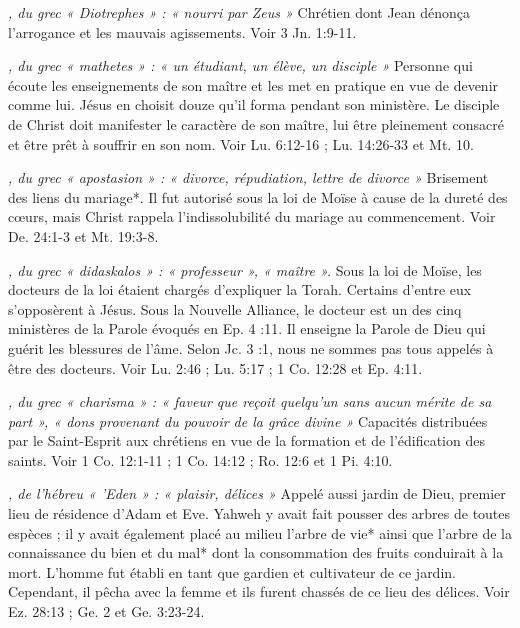 \begin{multicols}{2}
{\textit{, du grec « Diotrephes » : « nourri par Zeus »}\newline
Chrétien dont Jean dénonça l'arrogance et les mauvais agissements. Voir 3 Jn. 1:9-11.

\textit{, du grec « mathetes » : « un étudiant, un élève, un disciple »}\newline
Personne qui écoute les enseignements de son maître et les met en pratique en vue de devenir comme lui. Jésus en choisit douze qu'il forma pendant son ministère. Le disciple de Christ doit manifester le caractère de son maître, lui être pleinement consacré et être prêt à souffrir en son nom. Voir Lu. 6:12-16 ; Lu. 14:26-33 et Mt. 10.

\textit{, du grec « apostasion » : « divorce, répudiation, lettre de divorce »}\newline
Brisement des liens du mariage*. Il fut autorisé sous la loi de Moïse à cause de la dureté des cœurs, mais Christ rappela l'indissolubilité du mariage au commencement. Voir De. 24:1-3 et Mt. 19:3-8.

\textit{, du grec « didaskalos » : « professeur », « maître ».}\newline
Sous la loi de Moïse, les docteurs de la loi étaient chargés d'expliquer la Torah. Certains d'entre eux s'opposèrent à Jésus. Sous la Nouvelle Alliance, le docteur est un des cinq ministères de la Parole évoqués en Ep. 4 :11. Il enseigne la Parole de Dieu qui guérit les blessures de l'âme. Selon Jc. 3 :1, nous ne sommes pas tous appelés à être des docteurs. Voir Lu. 2:46 ; Lu. 5:17 ; 1 Co. 12:28 et Ep. 4:11.

\textit{, du grec « charisma » : « faveur que reçoit quelqu'un sans aucun mérite de sa part », « dons provenant du pouvoir de la grâce divine »}\newline
Capacités distribuées par le Saint-Esprit aux chrétiens en vue de la formation et de l'édification des saints. Voir 1 Co. 12:1-11 ; 1 Co. 14:12 ; Ro. 12:6 et 1 Pi. 4:10.

\textit{, de l'hébreu « 'Eden » : « plaisir, délices »}\newline
Appelé aussi jardin de Dieu, premier lieu de résidence d'Adam et Eve. Yahweh y avait fait pousser des arbres de toutes espèces ; il y avait également placé au milieu l'arbre de vie* ainsi que l'arbre de la connaissance du bien et du mal* dont la consommation des fruits conduirait à la mort. L'homme fut établi en tant que gardien et cultivateur de ce jardin. Cependant, il pêcha avec la femme et ils furent chassés de ce lieu des délices. Voir Ez. 28:13 ; Ge. 2 et Ge. 3:23-24.

}
\end{multicols}
